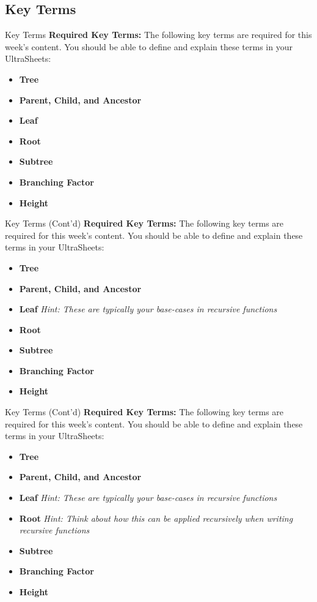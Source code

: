 \documentclass[hyperref={colorlinks,citecolor=blue,linkcolor=blue,urlcolor=blue}, aspectratio=1610]{beamer}
\begin{document}
\subsection{Key Terms}
\begin{frame}{Key Terms}
  \textbf{Required Key Terms:} The following key terms are required for this week's content. You should be able to define and explain these terms in your UltraSheets\texttrademark{}:
  \begin{itemize}
    \item \textbf{Tree}
    \item \textbf{Parent, Child, and Ancestor}
    \item \textbf{Leaf} 
    \item \textbf{Root} 
    \item \textbf{Subtree} 
    \item \textbf{Branching Factor}
    \item \textbf{Height}
  \end{itemize}
\end{frame}

\begin{frame}{Key Terms (Cont'd)}
  \textbf{Required Key Terms:} The following key terms are required for this week's content. You should be able to define and explain these terms in your UltraSheets\texttrademark{}:
  \begin{itemize}
    \item \textbf{Tree}
    \item \textbf{Parent, Child, and Ancestor}
    \item \textbf{Leaf} \textit{Hint: These are typically your base-cases in recursive functions}
    \item \textbf{Root}
    \item \textbf{Subtree} 
    \item \textbf{Branching Factor}
    \item \textbf{Height}
  \end{itemize}
\end{frame}

\begin{frame}{Key Terms (Cont'd)}
  \textbf{Required Key Terms:} The following key terms are required for this week's content. You should be able to define and explain these terms in your UltraSheets\texttrademark{}:
  \begin{itemize}
    \item \textbf{Tree}
    \item \textbf{Parent, Child, and Ancestor}
    \item \textbf{Leaf} \textit{Hint: These are typically your base-cases in recursive functions}
    \item \textbf{Root} \textit{Hint: Think about how this can be applied recursively when writing recursive functions}
    \item \textbf{Subtree} 
    \item \textbf{Branching Factor}
    \item \textbf{Height}
  \end{itemize}
\end{frame}
\end{document}

